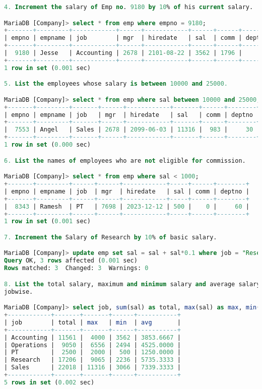 \documentclass[11pt]{article}
\begin{document}
\begin{lstlisting}[language=SQL]
4. Increment the salary of Emp no. 9180 by 10% of his current salary.

MariaDB [Company]> select * from emp where empno = 9180;
+-------+---------+------------+------+------------+------+------+--------+
| empno | empname | job        | mgr  | hiredate   | sal  | comm | deptno |
+-------+---------+------------+------+------------+------+------+--------+
|  9180 | Jesse   | Accounting | 2678 | 2101-08-22 | 3562 | 1796 |     10 |
+-------+---------+------------+------+------------+------+------+--------+
1 row in set (0.001 sec)

5. List the employees whose salary is between 10000 and 25000.

MariaDB [Company]> select * from emp where sal between 10000 and 25000;
+-------+---------+-------+------+------------+-------+------+--------+
| empno | empname | job   | mgr  | hiredate   | sal   | comm | deptno |
+-------+---------+-------+------+------------+-------+------+--------+
|  7553 | Angel   | Sales | 2678 | 2099-06-03 | 11316 |  983 |     30 |
+-------+---------+-------+------+------------+-------+------+--------+
1 row in set (0.000 sec)

6. List the names of employees who are not eligible for commission.

MariaDB [Company]> select * from emp where sal < 1000;
+-------+---------+------+------+------------+-----+------+--------+
| empno | empname | job  | mgr  | hiredate   | sal | comm | deptno |
+-------+---------+------+------+------------+-----+------+--------+
|  8343 | Ramesh  | PT   | 7698 | 2023-12-12 | 500 |    0 |     60 |
+-------+---------+------+------+------------+-----+------+--------+
1 row in set (0.001 sec)

7. Increment the Salary of Research by 10% of basic salary.

MariaDB [Company]> update emp set sal = sal + sal*0.1 where job = "Research";
Query OK, 3 rows affected (0.001 sec)
Rows matched: 3  Changed: 3  Warnings: 0

8. List the total salary, maximum and minimum salary and average salary of the employees
jobwise.

MariaDB [Company]> select job, sum(sal) as total, max(sal) as max, min(sal) as min, avg(sal) as avg from emp group by job;
+------------+-------+-------+------+-----------+
| job        | total | max   | min  | avg       |
+------------+-------+-------+------+-----------+
| Accounting | 11561 |  4000 | 3562 | 3853.6667 |
| Operations |  9050 |  6556 | 2494 | 4525.0000 |
| PT         |  2500 |  2000 |  500 | 1250.0000 |
| Research   | 17206 |  9065 | 2236 | 5735.3333 |
| Sales      | 22018 | 11316 | 3066 | 7339.3333 |
+------------+-------+-------+------+-----------+
5 rows in set (0.002 sec)


\end{lstlisting}
\end{document}
